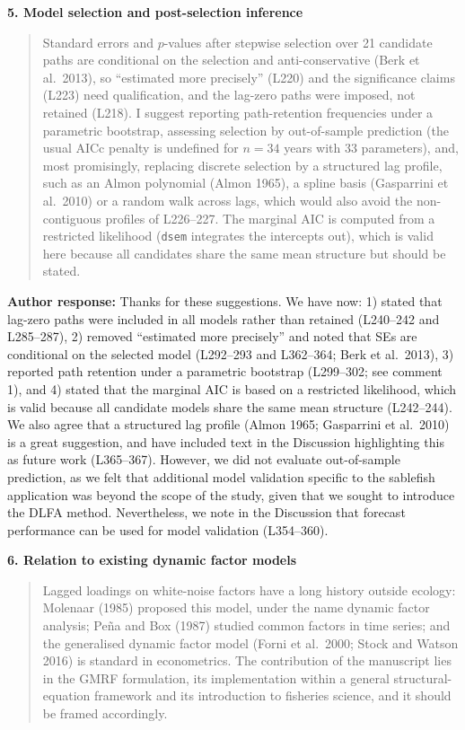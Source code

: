 \documentclass[11pt]{article}
\begin{document}
\textbf{5. Model selection and post-selection inference}

\begin{quote}
Standard errors and \(p\)-values after stepwise selection over 21
candidate paths are conditional on the selection and anti-conservative
(Berk et al.~2013), so ``estimated more precisely'' (L220) and the
significance claims (L223) need qualification, and the lag-zero paths
were imposed, not retained (L218). I suggest reporting path-retention
frequencies under a parametric bootstrap, assessing selection by
out-of-sample prediction (the usual AICc penalty is undefined for
\(n = 34\) years with 33 parameters), and, most promisingly, replacing
discrete selection by a structured lag profile, such as an Almon
polynomial (Almon 1965), a spline basis (Gasparrini et al.~2010) or a
random walk across lags, which would also avoid the non-contiguous
profiles of L226--227. The marginal AIC is computed from a restricted
likelihood (\texttt{dsem} integrates the intercepts out), which is valid
here because all candidates share the same mean structure but should be
stated.
\end{quote}

\textbf{Author response:} Thanks for these suggestions. We have now: 1)
stated that lag-zero paths were included in all models rather than
retained (L240--242 and L285--287), 2) removed ``estimated more
precisely'' and noted that SEs are conditional on the selected model
(L292--293 and L362--364; Berk et al.~2013), 3) reported path retention
under a parametric bootstrap (L299--302; see comment 1), and 4) stated
that the marginal AIC is based on a restricted likelihood, which is
valid because all candidate models share the same mean structure
(L242--244). We also agree that a structured lag profile (Almon 1965;
Gasparrini et al.~2010) is a great suggestion, and have included text in
the Discussion highlighting this as future work (L365--367). However, we
did not evaluate out-of-sample prediction, as we felt that additional
model validation specific to the sablefish application was beyond the
scope of the study, given that we sought to introduce the DLFA method.
Nevertheless, we note in the Discussion that forecast performance can be
used for model validation (L354--360).

\textbf{6. Relation to existing dynamic factor models}

\begin{quote}
Lagged loadings on white-noise factors have a long history outside
ecology: Molenaar (1985) proposed this model, under the name dynamic
factor analysis; Peña and Box (1987) studied common factors in time
series; and the generalised dynamic factor model (Forni et al.~2000;
Stock and Watson 2016) is standard in econometrics. The contribution of
the manuscript lies in the GMRF formulation, its implementation within a
general structural-equation framework and its introduction to fisheries
science, and it should be framed accordingly.
\end{quote}
\end{document}
